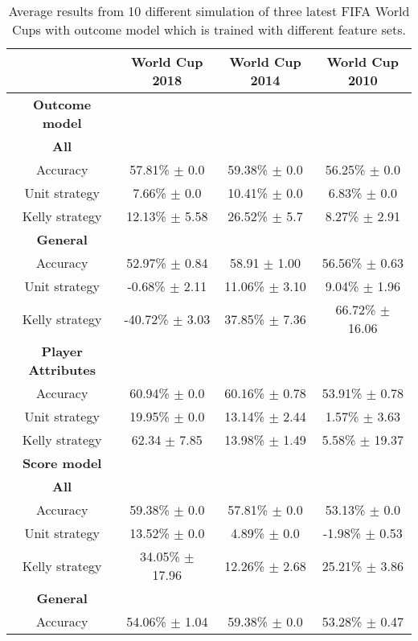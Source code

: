 \begin{table}
    \caption{Average results from 10 different simulation of three latest FIFA World Cups with outcome model which is trained with different feature sets.}
    \begin{tabular}{ | c |c| c | c |}
    \hline
    & World Cup 2018 & World Cup 2014 & World Cup 2010 \\
     \hline
    \hline
    \textbf{Outcome model} \\
    \hline
    \hline
    \textbf{All} \\
    \hline
    Accuracy & 57.81\% $\pm$ 0.0 & 59.38\% $\pm$  0.0 & 56.25\% $\pm$ 0.0 \\
    Unit strategy & 7.66\% $\pm$ 0.0 & 10.41\% $\pm$ 0.0 & 6.83\% $\pm$ 0.0 \\
    Kelly strategy& 12.13\% $\pm$ 5.58 & 26.52\% $\pm$ 5.7 & 8.27\% $\pm$ 2.91 \\
    \hline
    \textbf{General} \\
    \hline
    Accuracy & 52.97\% $\pm$ 0.84 & 58.91 $\pm$ 1.00 & 56.56\% $\pm$ 0.63 \\
    Unit strategy & -0.68\% $\pm$ 2.11 & 11.06\% $\pm$ 3.10 & 9.04\% $\pm$ 1.96 \\
    Kelly strategy & -40.72\% $\pm$ 3.03 & 37.85\% $\pm$ 7.36 & 66.72\% $\pm$ 16.06 \\
    \hline
    \textbf{Player Attributes} \\
    \hline
    Accuracy & 60.94\% $\pm$ 0.0 & 60.16\% $\pm$ 0.78 & 53.91\% $\pm$ 0.78 \\
    Unit strategy & 19.95\% $\pm$ 0.0 & 13.14\% $\pm$ 2.44 & 1.57\% $\pm$ 3.63 \\
    Kelly strategy & 62.34 $\pm$ 7.85 & 13.98\% $\pm$ 1.49 & 5.58\% $\pm$ 19.37 \\
    \hline
    \hline
    \textbf{Score model} \\
    \hline
    \hline
    \textbf{All} \\
    \hline
    Accuracy & 59.38\% $\pm$ 0.0 & 57.81\% $\pm$ 0.0 & 53.13\% $\pm$ 0.0 \\
    Unit strategy & 13.52\% $\pm$ 0.0 & 4.89\%  $\pm$ 0.0 & -1.98\% $\pm$ 0.53 \\
    Kelly strategy & 34.05\% $\pm$ 17.96 & 12.26\% $\pm$ 2.68 & 25.21\% $\pm$ 3.86 \\
    \hline
    \textbf{General} \\
    \hline
    Accuracy & 54.06\% $\pm$ 1.04 & 59.38\% $\pm$ 0.0 & 53.28\% $\pm$ 0.47 \\

\end{tabular}
\end{table}
